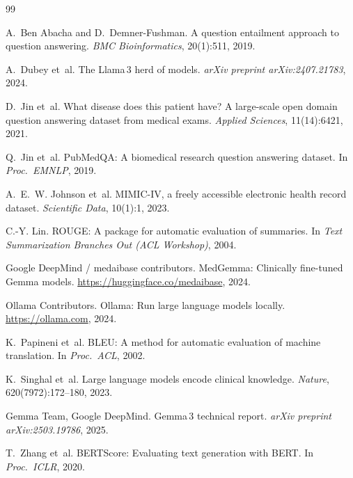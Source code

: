\documentclass[11pt]{article}
\begin{document}
\begin{thebibliography}{99}

A.~Ben Abacha and D.~Demner-Fushman.
\newblock A question entailment approach to question answering.
\newblock \emph{BMC Bioinformatics}, 20(1):511, 2019.

A.~Dubey et~al.
\newblock The Llama\,3 herd of models.
\newblock \emph{arXiv preprint arXiv:2407.21783}, 2024.

D.~Jin et~al.
\newblock What disease does this patient have? A large-scale open domain
question answering dataset from medical exams.
\newblock \emph{Applied Sciences}, 11(14):6421, 2021.

Q.~Jin et~al.
\newblock PubMedQA: A biomedical research question answering dataset.
\newblock In \emph{Proc.\ EMNLP}, 2019.

A.~E.~W. Johnson et~al.
\newblock MIMIC-IV, a freely accessible electronic health record dataset.
\newblock \emph{Scientific Data}, 10(1):1, 2023.

C.-Y. Lin.
\newblock ROUGE: A package for automatic evaluation of summaries.
\newblock In \emph{Text Summarization Branches Out (ACL Workshop)}, 2004.

{Google DeepMind / medaibase contributors}.
\newblock MedGemma: Clinically fine-tuned Gemma models.
\newblock \url{https://huggingface.co/medaibase}, 2024.

{Ollama Contributors}.
\newblock Ollama: Run large language models locally.
\newblock \url{https://ollama.com}, 2024.

K.~Papineni et~al.
\newblock BLEU: A method for automatic evaluation of machine translation.
\newblock In \emph{Proc.\ ACL}, 2002.

K.~Singhal et~al.
\newblock Large language models encode clinical knowledge.
\newblock \emph{Nature}, 620(7972):172--180, 2023.

{Gemma Team, Google DeepMind}.
\newblock Gemma\,3 technical report.
\newblock \emph{arXiv preprint arXiv:2503.19786}, 2025.

T.~Zhang et~al.
\newblock BERTScore: Evaluating text generation with BERT.
\newblock In \emph{Proc.\ ICLR}, 2020.


\end{thebibliography}
\end{document}
